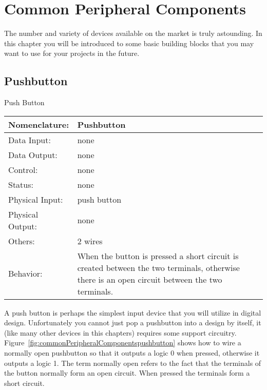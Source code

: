 \chapter{Common Peripheral Components}
\label{chapter:Common Peripheral Components}
\graphicspath{ {./chapter10/Fig} }

The number and variety of devices available on the market
is truly astounding.  In this chapter you will be introduced
to some basic building blocks that you may want to use for
your projects in the future.


\section{Pushbutton}
\label{page:pushbutton}
\begin{buildingblock}{Push Button}
\begin{tabular}{|l|p{3.5in}|} \hline
Nomenclature:  & Pushbutton         \\ \hline
Data Input:    & none         \\ \hline
Data Output:   & none   \\ \hline
Control:       & none           \\ \hline
Status:        & none                                   \\ \hline
Physical Input:& push button		\\ \hline
Physical Output:& none		\\ \hline
Others:        & 2 wires             \\ \hline
Behavior:      & When the button is pressed a short circuit is created
between the two terminals, otherwise there is an open circuit between
the two terminals. \\ \hline
\end{tabular}
\end{buildingblock}

A push button is perhaps the simplest input device that you will
utilize in digital design.  Unfortunately you cannot just pop
a pushbutton into a design by itself, it (like many other devices
in this chapters) requires some support circuitry.  
Figure~\ref{fig:commonPeripheralComponentspushbutton} shows how to wire a normally open
pushbutton so that it outputs a logic 0 when pressed, otherwise 
it outputs a logic 1.  The term normally open refers to the fact
that the terminals of the button normally form an open circuit.
When pressed the terminals form a short circuit.

